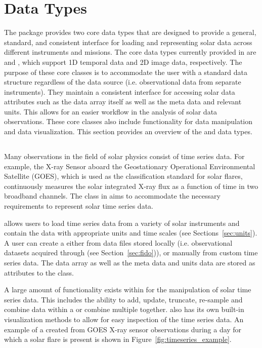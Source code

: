  \section{Data Types}
\label{sec:data_types}

The \sunpypkg package provides two core data types that are designed to provide a general, standard, and consistent interface for loading and representing solar data across different instruments and missions.
The core data types currently provided in \sunpypkg are \Timeseries and \Map, which support 1D temporal data and 2D image data, respectively. 
The purpose of these core classes is to accommodate the user with a standard data structure regardless of the data source (i.e. observational data from separate instruments). 
They maintain a consistent interface for accessing solar data attributes such as the data array itself as well as the meta data and relevant units. 
This allows for an easier workflow in the analysis of solar data observations.
These core classes also include functionality for data manipulation and data visualization. 
This section provides an overview of the \Timeseries and \Map data types.

\subsection{\Timeseries}
\label{sec:timeseries}
Many observations in the field of solar physics consist of time series data. 
For example, the X-ray Sensor aboard the Geostationary Operational Environmental Satellite (GOES), which is used as the classification standard for solar flares, continuously measures the solar integrated X-ray flux as a function of time in two broadband channels. 
The \Timeseries class in \sunpypkg aims to accommodate the necessary requirements to represent solar time series data.

\Timeseries allows users to load time series data from a variety of solar instruments and contain the data with appropriate units and time scales (see Sections~\ref{sec:units}). 
 A user can create a \Timeseries either from data files stored locally (i.e. observational datasets acquired through \Fido (see Section~\ref{sec:fido})), or manually from custom time series data. 
 The data array as well as the meta data and units data are stored as attributes to the \Timeseries class. 

A large amount of functionality exists within \Timeseries for the manipulation of solar time series data.
This includes the ability to add, update, truncate, re-sample and combine data within a \Timeseries or combine multiple \Timeseries together. 
\Timeseries also has its own built-in visualization methods to allow for easy inspection of the time series data. 
An example of a \Timeseries created from GOES X-ray sensor observations during a day for which a solar flare is present is shown in Figure~\ref{fig:timeseries_example}.

